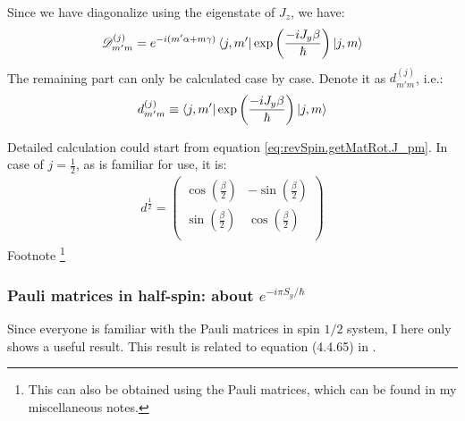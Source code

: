 \documentclass{article}
\numberwithin{equation}{subsection} %
\theoremstyle{definition}
\begin{document}

    Since we have diagonalize using the eigenstate of $J_z$, we have:
    \begin{align}
        \mathscr{D}^{(j)}_{m'm} =
            e^{-i(m'\alpha+m\gamma)}\bra{j,m'}
                \exp\left(\frac{-i J_y\beta}{\hbar}\right)
            \ket{j,m}
    \end{align}
    The remaining part can only be calculated case by case. Denote it as 
    $d^{(j)}_{m'm}$, i.e.:
    \begin{align}
        d^{(j)}_{m'm}\equiv \bra{j,m'}
                \exp\left(\frac{-i J_y\beta}{\hbar}\right)
            \ket{j,m}
    \end{align}

    Detailed calculation could start from equation
    \ref{eq:revSpin.getMatRot.J_pm}.
    In case of $j=\frac{1}{2}$, as is familiar for use, it is:
    \begin{align}
        d^{\frac{1}{2}}=\left( \begin{array}{cc}
            \cos \left(\frac{\beta }{2}\right) 
                & -\sin \left(\frac{\beta}{2}\right) \\
            \sin \left(\frac{\beta }{2}\right) 
                & \cos \left(\frac{\beta}{2}\right) \\
            \end{array} \right)
    \end{align}
    Footnote \footnote{This can also be obtained using the Pauli matrices,
    which can be found in my miscellaneous notes.}
    
    \subsubsection{Pauli matrices in half-spin: about \texorpdfstring{$e^{-i\pi S_y/\hbar}$}{}}
    \label{sec:About-exp(-i*pi-S_y/hbar)}

    Since everyone is familiar with the Pauli matrices in spin $1/2$
    system, I here only shows a useful result. This result is related to
    equation (4.4.65) in \cite{sakurai}.
\end{document}
